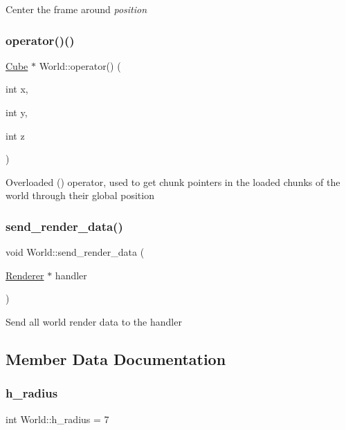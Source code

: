 Center the frame around {\itshape position} {\itshape } \mbox{\label{classWorld_ade33d093b4560af74cec4fa9264cf078}} 
\subsubsection{\texorpdfstring{operator()()}{operator()()}}
{\footnotesize\ttfamily \mbox{\hyperlink{classCube}{Cube}} $\ast$ World\+::operator() (\begin{DoxyParamCaption}\item[{int}]{x,  }\item[{int}]{y,  }\item[{int}]{z }\end{DoxyParamCaption})}

Overloaded () operator, used to get chunk pointers in the loaded chunks of the world through their global position \mbox{\label{classWorld_af79323774823279380a7db9d61ed8028}} 
\subsubsection{\texorpdfstring{send\+\_\+render\+\_\+data()}{send\_render\_data()}}
{\footnotesize\ttfamily void World\+::send\+\_\+render\+\_\+data (\begin{DoxyParamCaption}\item[{\mbox{\hyperlink{classRenderer}{Renderer}} $\ast$}]{handler }\end{DoxyParamCaption})}

Send all world render data to the handler 

\subsection{Member Data Documentation}
\mbox{\label{classWorld_aeb621b5ca0eba8ee3d0a1d2bfa11b278}} 
\subsubsection{\texorpdfstring{h\+\_\+radius}{h\_radius}}
{\footnotesize\ttfamily int World\+::h\+\_\+radius = 7}

